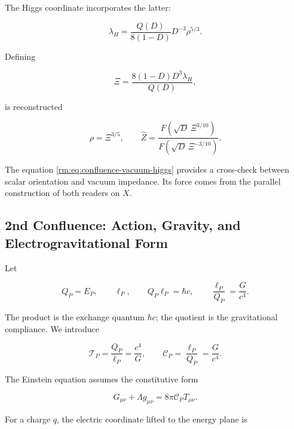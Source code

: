 The Higgs coordinate incorporates the latter:

\begin{equation}
 \lambda_H=\frac{Q(D)}{8(1-D)}D^{-3}\rho^{5/3}.
 \label{rm:eq:confluence-higgs}
\end{equation}

Defining

\begin{equation}
 \Xi=\frac{8(1-D)D^3\lambda_H}{Q(D)},
 \label{rm:eq:confluence-xi}
\end{equation}

is reconstructed

\begin{equation}
 \rho=\Xi^{3/5},
 \qquad
 \widehat Z=
 \frac{F(\sqrt D\,\Xi^{3/10})}
      {F(\sqrt D\,\Xi^{-3/10})}.
 \label{rm:eq:confluence-vacuum-higgs}
\end{equation}

The equation \cref{rm:eq:confluence-vacuum-higgs} provides a cross-check between scalar orientation and vacuum impedance. Its force comes from the parallel construction of both readers on \(X\).

\subsection{2nd Confluence: Action, Gravity, and Electrogravitational Form}

Let

\begin{equation}
 Q_P=E_P,
 \qquad
 \ell_P,
 \qquad
 Q_P\ell_P=\hbar c,
 \qquad
 \frac{\ell_P}{Q_P}=\frac{G}{c^4}.
 \label{rm:eq:confluence-planck-pair}
\end{equation}

The product is the exchange quantum \(\hbar c\); the quotient is the
gravitational compliance. We introduce

\begin{equation}
 \mathscr T_P=\frac{Q_P}{\ell_P}=\frac{c^4}{G},
 \qquad
 \mathscr C_P=\frac{\ell_P}{Q_P}=\frac{G}{c^4}.
 \label{rm:eq:confluence-tension-compliance}
\end{equation}

The Einstein equation assumes the constitutive form

\begin{equation}
 G_{\mu\nu}+\Lambda g_{\mu\nu}
 =8\pi\mathscr C_P T_{\mu\nu}.
 \label{rm:eq:confluence-einstein-constitutive}
\end{equation}

For a charge \(q\), the electric coordinate lifted to the energy plane
is


